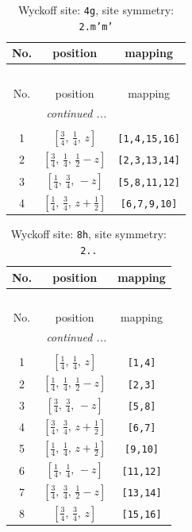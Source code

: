 \documentclass[fleqn,8pt]{jsarticle}
\begin{document}
\renewcommand{\arraystretch}{1.2}
\begin{longtable}{ccc}
\caption{Wyckoff site: {\tt 4g}, site symmetry: {\tt 2.m'm'}}
 \\
 \hline \hline
No. & position & mapping \\ \hline \endfirsthead

\multicolumn{2}{l}{\tablename\ \thetable{}} \\
 \hline \hline
No. & position & mapping \\ \hline \endhead

 \hline \hline
\multicolumn{2}{r}{\footnotesize\it continued ...} \\ \endfoot

 \hline \hline
\multicolumn{2}{r}{} \\ \endlastfoot

1 & $\left[ \frac{3}{4},\, \frac{1}{4},\, z \right]$ & {\tt [1,4,15,16]} \\ \hline
2 & $\left[ \frac{3}{4},\, \frac{1}{4},\, \frac{1}{2} - z \right]$ & {\tt [2,3,13,14]} \\ \hline
3 & $\left[ \frac{1}{4},\, \frac{3}{4},\, - z \right]$ & {\tt [5,8,11,12]} \\ \hline
4 & $\left[ \frac{1}{4},\, \frac{3}{4},\, z + \frac{1}{2} \right]$ & {\tt [6,7,9,10]} \\
\end{longtable}
\renewcommand{\arraystretch}{1.2}
\begin{longtable}{ccc}
\caption{Wyckoff site: {\tt 8h}, site symmetry: {\tt 2..}}
 \\
 \hline \hline
No. & position & mapping \\ \hline \endfirsthead

\multicolumn{2}{l}{\tablename\ \thetable{}} \\
 \hline \hline
No. & position & mapping \\ \hline \endhead

 \hline \hline
\multicolumn{2}{r}{\footnotesize\it continued ...} \\ \endfoot

 \hline \hline
\multicolumn{2}{r}{} \\ \endlastfoot

1 & $\left[ \frac{1}{4},\, \frac{1}{4},\, z \right]$ & {\tt [1,4]} \\ \hline
2 & $\left[ \frac{1}{4},\, \frac{1}{4},\, \frac{1}{2} - z \right]$ & {\tt [2,3]} \\ \hline
3 & $\left[ \frac{3}{4},\, \frac{3}{4},\, - z \right]$ & {\tt [5,8]} \\ \hline
4 & $\left[ \frac{3}{4},\, \frac{3}{4},\, z + \frac{1}{2} \right]$ & {\tt [6,7]} \\ \hline
5 & $\left[ \frac{1}{4},\, \frac{1}{4},\, z + \frac{1}{2} \right]$ & {\tt [9,10]} \\ \hline
6 & $\left[ \frac{1}{4},\, \frac{1}{4},\, - z \right]$ & {\tt [11,12]} \\ \hline
7 & $\left[ \frac{3}{4},\, \frac{3}{4},\, \frac{1}{2} - z \right]$ & {\tt [13,14]} \\ \hline
8 & $\left[ \frac{3}{4},\, \frac{3}{4},\, z \right]$ & {\tt [15,16]} \\
\end{longtable}
\end{document}
